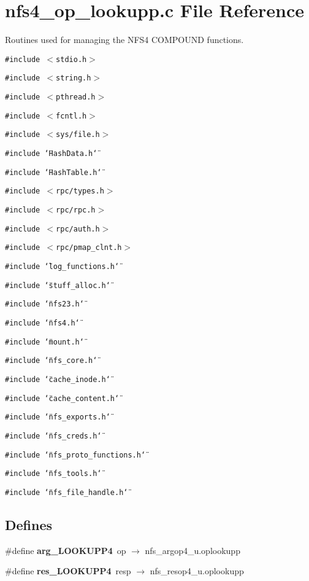 \section{nfs4\_\-op\_\-lookupp.c File Reference}
\label{nfs4__op__lookupp_8c}
Routines used for managing the NFS4 COMPOUND functions. 

{\tt \#include $<$stdio.h$>$}\par
{\tt \#include $<$string.h$>$}\par
{\tt \#include $<$pthread.h$>$}\par
{\tt \#include $<$fcntl.h$>$}\par
{\tt \#include $<$sys/file.h$>$}\par
{\tt \#include \char`\"{}Hash\-Data.h\char`\"{}}\par
{\tt \#include \char`\"{}Hash\-Table.h\char`\"{}}\par
{\tt \#include $<$rpc/types.h$>$}\par
{\tt \#include $<$rpc/rpc.h$>$}\par
{\tt \#include $<$rpc/auth.h$>$}\par
{\tt \#include $<$rpc/pmap\_\-clnt.h$>$}\par
{\tt \#include \char`\"{}log\_\-functions.h\char`\"{}}\par
{\tt \#include \char`\"{}stuff\_\-alloc.h\char`\"{}}\par
{\tt \#include \char`\"{}nfs23.h\char`\"{}}\par
{\tt \#include \char`\"{}nfs4.h\char`\"{}}\par
{\tt \#include \char`\"{}mount.h\char`\"{}}\par
{\tt \#include \char`\"{}nfs\_\-core.h\char`\"{}}\par
{\tt \#include \char`\"{}cache\_\-inode.h\char`\"{}}\par
{\tt \#include \char`\"{}cache\_\-content.h\char`\"{}}\par
{\tt \#include \char`\"{}nfs\_\-exports.h\char`\"{}}\par
{\tt \#include \char`\"{}nfs\_\-creds.h\char`\"{}}\par
{\tt \#include \char`\"{}nfs\_\-proto\_\-functions.h\char`\"{}}\par
{\tt \#include \char`\"{}nfs\_\-tools.h\char`\"{}}\par
{\tt \#include \char`\"{}nfs\_\-file\_\-handle.h\char`\"{}}\par
\subsection*{Defines}
\begin{CompactItemize}
\item 
\#define {\bf arg\_\-LOOKUPP4}\ op $\rightarrow$ nfs\_\-argop4\_\-u.oplookupp
\item 
\#define {\bf res\_\-LOOKUPP4}\ resp $\rightarrow$ nfs\_\-resop4\_\-u.oplookupp
\end{CompactItemize}
